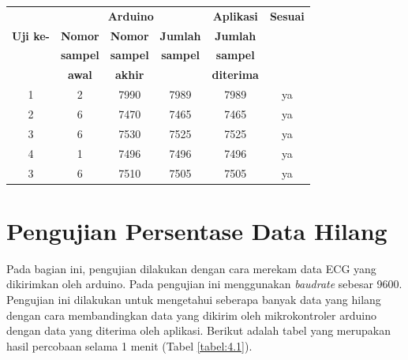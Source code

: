 \begin{table}[H]
	\begin{tabular}{|c|c|c|c|c|c|}
		\hline
		\multirow{3}{*}{\textbf{Uji ke-}} & \multicolumn{3}{|c|}{\textbf{Arduino}}& \multicolumn{1}{|c|}{\textbf{Aplikasi}}&
		\multicolumn{1}{|c|}{\textbf{Sesuai}}\\
		\cline{2-5} & \textbf{Nomor} & \textbf{Nomor} & \textbf{Jumlah}&\textbf{Jumlah} &  \\
		 & \textbf{sampel} & \textbf{sampel} & \textbf{sampel}& \textbf{sampel}&\\
		 &\textbf{awal}&\textbf{akhir}&&\textbf{diterima}&\\
		\hline1& 2 &7990 & 7989&7989&ya\\
		\hline2&6&7470&7465&7465 &ya  \\
		\hline3&6 &7530 &7525&7525&ya \\
		\hline4&1 &7496 &7496&7496&ya \\
		\hline3&6 &7510 &7505&7505&ya \\
		\hline
	\end{tabular}
\end{table}

\section{Pengujian Persentase Data Hilang}
\vspace{1ex}
Pada bagian ini, pengujian dilakukan dengan cara merekam data ECG yang dikirimkan oleh arduino. Pada pengujian ini menggunakan \textit{baudrate} sebesar 9600. Pengujian ini dilakukan untuk mengetahui seberapa banyak data yang hilang dengan cara membandingkan data yang dikirim oleh mikrokontroler arduino dengan data yang diterima oleh aplikasi. Berikut adalah tabel yang merupakan hasil percobaan selama 1 menit (Tabel \ref{tabel:4.1}).



